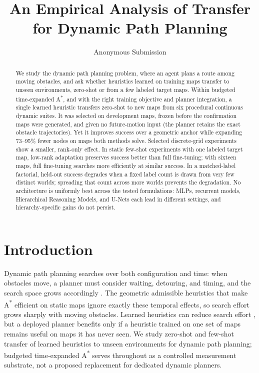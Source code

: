 \documentclass[letterpaper]{article} %
\title{An Empirical Analysis of Transfer for Dynamic Path Planning}
\author{
    Anonymous Submission
}
\begin{document}
\maketitle

\begin{abstract}
We study the dynamic path planning problem, where an agent plans a route among moving obstacles, and ask whether heuristics learned on training maps transfer to unseen environments, zero-shot or from a few labeled target maps. Within budgeted time-expanded A\textsuperscript{*}, and with the right training objective and planner integration, a single learned heuristic transfers zero-shot to new maps from six procedural continuous dynamic suites. It was selected on development maps, frozen before the confirmation maps were generated, and given no future-motion input (the planner retains the exact obstacle trajectories). Yet it improves success over a geometric anchor while expanding 73--95\% fewer nodes on maps both methods solve. Selected discrete-grid experiments show a smaller, rank-only effect. In static few-shot experiments with one labeled target map, low-rank adaptation preserves success better than full fine-tuning; with sixteen maps, full fine-tuning searches more efficiently at similar success. In a matched-label factorial, held-out success degrades when a fixed label count is drawn from very few distinct worlds; spreading that count across more worlds prevents the degradation. No architecture is uniformly best across the tested formulations: MLPs, recurrent models, Hierarchical Reasoning Models, and U-Nets each lead in different settings, and hierarchy-specific gains do not persist.
\end{abstract}

\section{Introduction}

Dynamic path planning searches over both configuration and time: when obstacles move, a planner must consider waiting, detouring, and timing, and the search space grows accordingly \citep{silver2005cooperative,phillips2011sipp}. The geometric admissible heuristics that make A\textsuperscript{*} \citep{hart1968astar} efficient on static maps ignore exactly these temporal effects, so search effort grows sharply with moving obstacles. Learned heuristics can reduce search effort \citep{arfaee2011bootstrap,bhardwaj2017sail,yonetani2021neuralastar}, but a deployed planner benefits only if a heuristic trained on one set of maps remains useful on maps it has never seen. We study zero-shot and few-shot transfer of learned heuristics to unseen environments for dynamic path planning; budgeted time-expanded A\textsuperscript{*} serves throughout as a controlled measurement substrate, not a proposed replacement for dedicated dynamic planners.
\end{document}
